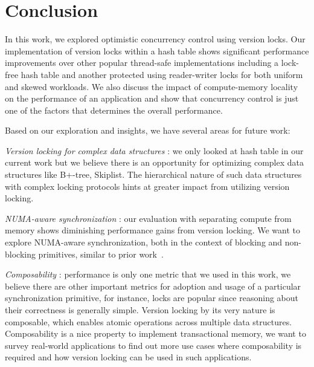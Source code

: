 \section{Conclusion}
\label{s:concl}

In this work, we explored optimistic concurrency control using version locks. Our
implementation of version locks within a hash table shows significant performance
improvements over other popular thread-safe implementations including a lock-free
hash table and another protected using reader-writer locks for both uniform and
skewed workloads. We also discuss the impact of compute-memory locality on the
performance of an application and show that concurrency control is just one of
the factors that determines the overall performance.

Based on our exploration and insights, we have several areas for future work:

\squishlists

\item \textit{Version locking for complex data structures} : we only looked at
hash table in our current work but we believe there is an opportunity for
optimizing complex data structures like B+-tree, Skiplist. The hierarchical 
nature of such data structures with complex locking protocols hints at greater
impact from utilizing version locking.

\item \textit{NUMA-aware synchronization} : our evaluation with separating
compute from memory shows diminishing performance gains from version locking.
We want to explore NUMA-aware synchronization, both in the context of blocking
and non-blocking primitives, similar to prior work~\cite{numarwlocks-calciu-ppopp13,
salsa-gidron-spaa12}.

\item \textit{Composability} : performance is only one metric that we used in this
work, we believe there are other important metrics for adoption and usage of a
particular synchronization primitive, for instance, locks are popular since reasoning
about their correctness is generally simple. Version locking by its very nature is
composable, which enables atomic operations across multiple data structures. Composability
is a nice property to implement transactional memory, we want to survey real-world
applications to find out more use cases where composability is required and how
version locking can be used in such applications.

\squishends
